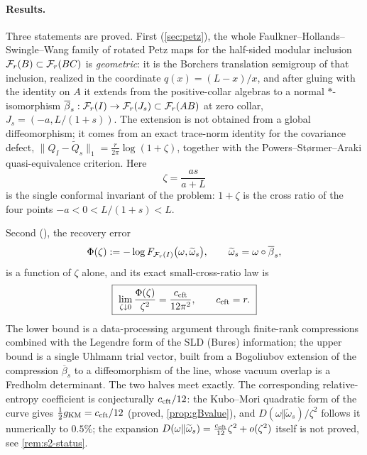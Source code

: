 \paragraph{Results.}
Three statements are proved.  First (\cref{sec:petz}), the whole
Faulkner--Hollands--Swingle--Wang family of rotated Petz maps for the half-sided
modular inclusion $\mathcal F_r(B)\subset\mathcal F_r(BC)$ is \emph{geometric}: it is the
Borchers translation semigroup of that inclusion, realized in the coordinate
$q(x)=(L-x)/x$, and after gluing with the identity on $A$ it extends from the
positive-collar algebras to a normal $*$-isomorphism
$\overline\beta_s:\mathcal F_r(I)\to\mathcal F_r(J_s)\subset\mathcal F_r(AB)$ at zero collar,
$J_s=(-a,L/(1+s))$.  The extension is not obtained from a global diffeomorphism;
it comes from an exact trace-norm identity for the covariance defect,
$\|Q_I-\widetilde Q_s\|_1=\frac r{2\pi}\log(1+\zeta)$, together with the
Powers--St\o rmer--Araki quasi-equivalence criterion.  Here
\begin{equation}\label{eq:zeta-intro}
 \zeta=\frac{as}{a+L}
\end{equation}
is the single conformal invariant of the problem: $1+\zeta$ is the cross ratio of
the four points $-a<0<L/(1+s)<L$.

Second (), the recovery error
\begin{equation}
 \Phi(\zeta):=-\log F_{\mathcal F_r(I)}\bigl(\omega,\widetilde\omega_s\bigr),
 \qquad \widetilde\omega_s=\omega\circ\overline\beta_s ,
\end{equation}
is a function of $\zeta$ alone, and its exact small-cross-ratio law is
\begin{equation}\label{eq:main-intro}
 \boxed{\ \lim_{\zeta\downarrow0}\frac{\Phi(\zeta)}{\zeta^2}=\frac{c_{\rm cft}}{12\pi^2},
 \qquad c_{\rm cft}=r.\ }
\end{equation}
The lower bound is a data-processing argument through finite-rank compressions
combined with the Legendre form of the SLD (Bures) information; the upper bound
is a single Uhlmann trial vector, built from a Bogoliubov extension of the
compression $\overline\beta_s$ to a diffeomorphism of the line, whose vacuum
overlap is a Fredholm determinant.  The two halves meet exactly.  The
corresponding relative-entropy coefficient is conjecturally $c_{\rm cft}/12$:
the Kubo--Mori quadratic form of the curve gives $\frac12g_{\rm KM}=c_{\rm cft}/12$ (proved, \cref{prop:gBvalue}), and
$D(\omega\Vert\widetilde\omega_s)/\zeta^2$ follows it numerically to $0.5\%$; the expansion
$D(\omega\Vert\widetilde\omega_s)=\frac{c_{\rm cft}}{12}\zeta^2+o(\zeta^2)$ itself is not proved, see \cref{rem:s2-status}.

